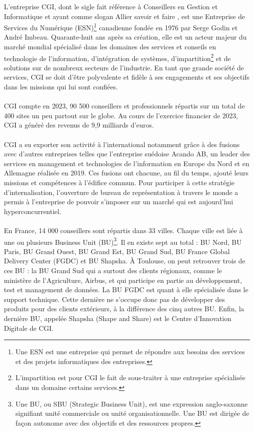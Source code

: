 \documentclass[12pt, a4paper]{report}
\begin{document}
	L'entreprise CGI, dont le sigle fait référence à \flqq{} Conseillers en Gestion et Informatique \frqq{} et ayant comme slogan \flqq{} Allier savoir et faire \frqq{}, est une Entreprise de Services du Numérique (ESN)\footnote{Une ESN est une entreprise qui permet de répondre aux besoins des services et des projets informatiques des entreprises.} canadienne fondée en 1976 par Serge Godin et André Imbeau. Quarante-huit ans après sa création, elle est un acteur majeur du marché mondial spécialisé dans les domaines des services et conseils en technologie de l'information, d'intégration de systèmes, d'impartition\footnote{L'impartition est pour CGI le fait de sous-traiter à une entreprise spécialisée dans un domaine certains services.} et de solutions sur de nombreux secteurs de l'industrie. En tant que grande société de services, CGI se doit d'être polyvalente et fidèle à ses engagements et ses objectifs dans les missions qui lui sont confiées.
	\\\\
	CGI compte en 2023, 90 500 conseillers et professionnels répartis sur un total de 400 sites un peu partout sur le globe. Au cours de l'exercice financier de 2023, CGI a généré des revenus de 9,9 milliards d'euros.
	\\\\
	CGI a su exporter son activité à l'international notamment grâce à des fusions avec d'autres entreprises telles que l'entreprise suédoise Acando AB, un leader des services en management et technologies de l'information en Europe du Nord et en Allemagne réalisée en 2019. Ces fusions ont chacune, au fil du temps, ajouté leurs missions et compétences à l'édifice commun. Pour participer à cette stratégie d'internalisation, l'ouverture de bureau de représentation à travers le monde a permis à l'entreprise de pouvoir s'imposer sur un marché qui est aujourd'hui hyperconcurrentiel.
	\\\\
	En France, 14 000 conseillers sont répartis dans 33 villes. Chaque ville est liée à une ou plusieurs Business Unit (BU)\footnote{Une BU, ou SBU (Strategic Business Unit), est une expression anglo-saxonne signifiant unité commerciale ou unité organisationnelle. Une BU est dirigée de façon autonome avec des objectifs et des ressources propres.}. Il en existe sept au total : BU Nord, BU Paris, BU Grand Ouest, BU Grand Est, BU Grand Sud, BU France Global Delivery Center (FGDC) et BU Shapsha. À Toulouse, on peut retrouver trois de ces BU : la BU Grand Sud qui a surtout des clients régionaux, comme le ministère de l'Agriculture, Airbus, et qui participe en partie au développement, test et management de données. La BU FGDC est quant à elle spécialisée dans le support technique. Cette dernière ne s'occupe donc pas de développer des produits pour des clients extérieurs, à la différence des cinq autres BU. Enfin, la dernière BU, appelée Shapsha (Shape and Share) est le Centre d'Innovation Digitale de CGI.
\end{document}

